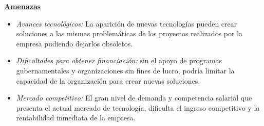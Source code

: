\documentclass[a4paper,12pt]{article}
\begin{document}
    \newpage
    \textbf{\underline{Amenazas}}
    \begin{itemize}
        \item[] \textit{Avances tecnológicos:} La aparición de nuevas tecnologías pueden crear soluciones a las mismas problemáticas de los proyectos realizados por la empresa pudiendo dejarlos obsoletos.
        \item[] \textit{Dificultades para obtener financiación:} sin el apoyo de programas gubernamentales y organizaciones sin fines de lucro, podría limitar la capacidad de la organización para crear nuevas soluciones.
        \item[] \textit{Mercado competitivo:} El gran nivel de demanda y competencia salarial que presenta el actual mercado de tecnología, dificulta el ingreso competitivo y la rentabilidad inmediata de la empresa.
    \end{itemize}
\end{document}
